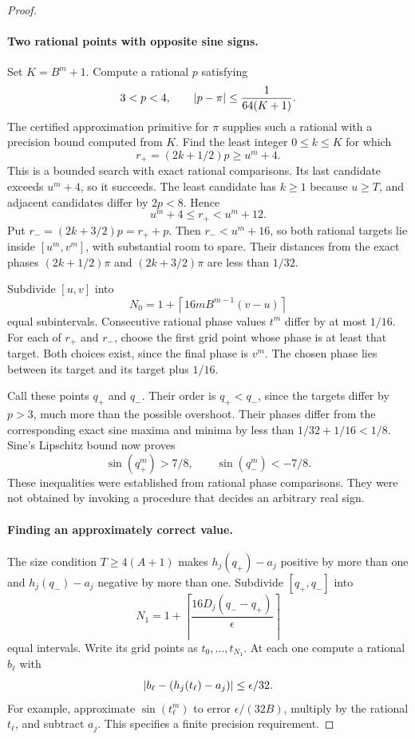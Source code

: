 \begin{proof}
\paragraph{Two rational points with opposite sine signs.}
Set $K=B^m+1$. Compute a rational $p$ satisfying
\[
 3<p<4,
 \qquad \left|p-\pi\right|\le\frac1{64(K+1)}.
\]
The certified approximation primitive for $\pi$ supplies such a rational
with a precision bound computed from $K$. Find the least integer
$0\le k\le K$ for which
\[
 r_+=(2k+1/2)p\ge u^m+4.
\]
This is a bounded search with exact rational comparisons. Its last candidate
exceeds $u^m+4$, so it succeeds. The least candidate has $k\ge1$ because
$u\ge T$, and adjacent candidates differ by $2p<8$. Hence
\[
 u^m+4\le r_+<u^m+12.
\]
Put $r_-=(2k+3/2)p=r_++p$. Then $r_-<u^m+16$, so both rational
targets lie inside $[u^m,v^m]$, with substantial room to spare. Their
distances from the exact phases $(2k+1/2)\pi$ and $(2k+3/2)\pi$ are
less than $1/32$.

Subdivide $[u,v]$ into
\[
 N_0=1+\left\lceil16mB^{m-1}(v-u)\right\rceil
\]
equal subintervals. Consecutive rational phase values $t^m$ differ by at
most $1/16$. For each of $r_+$ and $r_-$, choose the first grid point
whose phase is at least that target. Both choices exist, since the final
phase is $v^m$. The chosen phase lies between its target and its target
plus $1/16$.

Call these points $q_+$ and $q_-$. Their order is $q_+<q_-$, since the
targets differ by $p>3$, much more than the possible overshoot. Their
phases differ from the corresponding exact sine maxima and minima by less
than $1/32+1/16<1/8$. Sine's Lipschitz bound now proves
\begin{equation}
 \sin(q_+^m)>7/8,
 \qquad
 \sin(q_-^m)<-7/8.\label{eq:opposite-sines}
\end{equation}
These inequalities were established from rational phase comparisons. They
were not obtained by invoking a procedure that decides an arbitrary real
sign.

\paragraph{Finding an approximately correct value.}
The size condition $T\ge4(A+1)$ makes
$h_j(q_+)-a_j$ positive by more than one and
$h_j(q_-)-a_j$ negative by more than one. Subdivide $[q_+,q_-]$ into
\[
 N_1=1+\left\lceil
          \frac{16D_j(q_--q_+)}\epsilon
       \right\rceil
\]
equal intervals. Write its grid points as $t_0,\ldots,t_{N_1}$.
At each one compute a rational $b_\ell$ with
\[
 \left|b_\ell-(h_j(t_\ell)-a_j)\right|\le\epsilon/32.
\]
For example, approximate $\sin(t_\ell^m)$ to error
$\epsilon/(32B)$, multiply by the rational $t_\ell$, and subtract
$a_j$. This specifies a finite precision requirement.


\end{proof}
